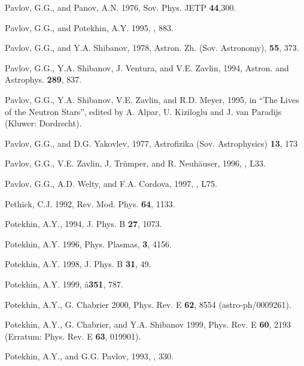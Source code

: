 \begin{references}
\harvarditem{}{}{}
Pavlov, G.G., and Panov, A.N. 1976, Sov. Phys. JETP {\bf 44},300.

\harvarditem{}{}{}
Pavlov, G.G., and Potekhin, A.Y. 1995, , 883.

\harvarditem{}{}{}
Pavlov, G.G., and Y.A. Shibanov, 1978, Astron. Zh. (Sov. Astronomy), 
{\bf 55}, 373.
 
\harvarditem{}{}{}
Pavlov, G.G., Y.A. Shibanov, J. Ventura, and V.E. Zavlin, 
1994, Astron. and Astrophys. {\bf 289}, 837.

\harvarditem{}{}{}
Pavlov, G.G., Y.A. Shibanov, V.E. Zavlin, and R.D. Meyer, 1995, 
in ``The Lives of the Neutron Stars'', edited by A. Alpar, U. Kiziloglu and 
J. van Paradijs (Kluwer: Dordrecht).

\harvarditem{}{}{}
Pavlov, G.G., and D.G. Yakovlev, 1977, Astrofizika (Sov. Astrophysics)
{\bf 13}, 173

\harvarditem{}{}{}
Pavlov, G.G., V.E. Zavlin, J. Tr\"umper, and R. Neuh\"auser,
1996, , L33.

\harvarditem{}{}{}
Pavlov, G.G., A.D. Welty, and F.A. Cordova, 1997, , L75.

\harvarditem{}{}{}
Pethick, C.J. 1992, Rev. Mod. Phys. {\bf 64}, 1133.

\harvarditem{}{}{}
Potekhin, A.Y., 1994, J. Phys. B {\bf 27}, 1073.

\harvarditem{}{}{}
Potekhin, A.Y. 1996, Phys. Plasmas, {\bf 3}, 4156.

\harvarditem{}{}{}
Potekhin, A.Y. 1998, J. Phys. B {\bf 31}, 49.

\harvarditem{}{}{}
Potekhin, A.Y. 1999, \aa {\bf 351}, 787.

\harvarditem{}{}{}
Potekhin, A.Y., G. Chabrier 2000, Phys. Rev. E {\bf 62}, 8554 
(astro-ph/0009261).

\harvarditem{}{}{}
Potekhin, A.Y., G. Chabrier, and Y.A. Shibanov  1999, Phys. Rev. E {\bf 60}, 
2193 (Erratum: Phys. Rev. E {\bf 63}, 019901).

\harvarditem{}{}{}
Potekhin, A.Y., and G.G. Pavlov, 1993, , 330.


\end{references}
